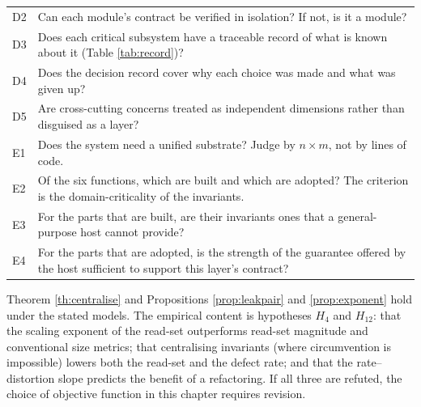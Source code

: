 {\begin{longtable}{L{1.0cm}L{14.0cm}}
D2 & Can each module's contract be verified in isolation? If not, is it a module?\\
D3 & Does each critical subsystem have a traceable record of what is known about it (Table \ref{tab:record})?\\
D4 & Does the decision record cover why each choice was made and what was given up?\\
D5 & Are cross-cutting concerns treated as independent dimensions rather than disguised as a layer?\\
\midrule
E1 & Does the system need a unified substrate? Judge by $n \times m$, not by lines of code.\\
E2 & Of the six functions, which are built and which are adopted? The criterion is the domain-criticality of the invariants.\\
E3 & For the parts that are built, are their invariants ones that a general-purpose host cannot provide?\\
E4 & For the parts that are adopted, is the strength of the guarantee offered by the host sufficient to support this layer's contract?\\
\bottomrule
\end{longtable}}

Theorem \ref{th:centralise} and Propositions \ref{prop:leakpair} and \ref{prop:exponent}
hold under the stated models. The empirical content is hypotheses $H_4$ and $H_{12}$: that
the scaling exponent of the read-set outperforms read-set magnitude and conventional size
metrics; that centralising invariants (where circumvention is impossible) lowers both the
read-set and the defect rate; and that the rate--distortion slope predicts the benefit of a
refactoring. If all three are refuted, the choice of objective function in this chapter
requires revision.
